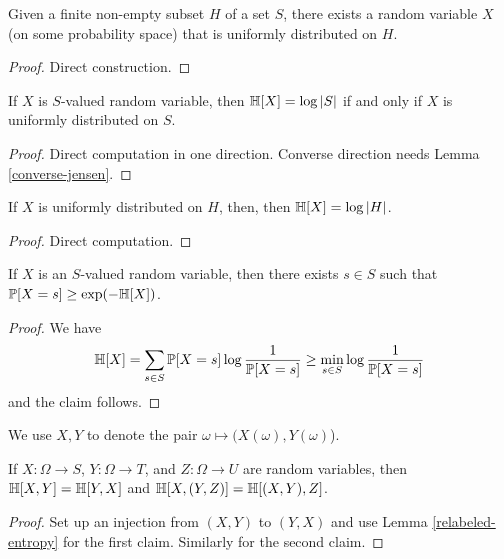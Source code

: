 \begin{lemma}\label{unif-exist}
  \leanok
  Given a finite non-empty subset $H$ of a set $S$, there exists a random variable $X$ (on some probability space) that is uniformly distributed on $H$.
\end{lemma}

\begin{proof} Direct construction.
\end{proof}


\begin{lemma}\label{uniform-entropy}
  \leanok
  If $X$ is $S$-valued random variable, then $\mathbb{H}[X] = \log |S|$ if and only if $X$ is uniformly distributed on $S$.
\end{lemma}

\begin{proof}  Direct computation in one direction.  Converse direction needs Lemma \ref{converse-jensen}.
\end{proof}

\begin{lemma}\label{uniform-entropy-II}
  \leanok
  If $X$ is uniformly distributed on $H$, then, then $\mathbb{H}[X] = \log |H|$.
\end{lemma}

\begin{proof} Direct computation.
\end{proof}

\begin{lemma}\label{bound-conc}
  \leanok
  If $X$ is an $S$-valued random variable, then there exists $s \in S$ such that $\mathbb{P}[X=s] \geq \exp(-\mathbb{H}[X])$.
\end{lemma}

\begin{proof}
  We have
  $$ \mathbb{H}[X] = \sum_{s \in S} \mathbb{P}[X=s] \log \frac{1}{\mathbb{P}[X=s]} \geq \min_{s \in S} \log \frac{1}{\mathbb{P}[X=s]}$$
  and the claim follows.
\end{proof}

We use $X,Y$ to denote the pair $\omega \mapsto (X(\omega),Y(\omega)$).

\begin{lemma}
  \label{entropy-comm}
  \leanok
  If $X: \Omega \to S$, $Y: \Omega \to T$, and $Z: \Omega \to U$ are random variables, then $\mathbb{H}[X, Y] = \mathbb{H}[Y, X]$ and $\mathbb{H}[X, (Y,Z)] = \mathbb{H}[(X,Y), Z]$.
\end{lemma}
\begin{proof}
  \leanok
  Set up an injection from $(X,Y)$ to $(Y,X)$ and use Lemma \ref{relabeled-entropy} for the first claim. Similarly for the second claim.
\end{proof}


